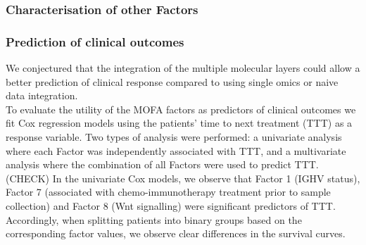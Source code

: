 \subsubsection{Characterisation of other Factors}

\subsubsection{Prediction of clinical outcomes}


We conjectured that the integration of the multiple molecular layers could allow a better prediction of clinical response compared to using single omics or naive data integration.\\
To evaluate the utility of the MOFA factors as predictors of clinical outcomes we fit Cox regression models \cite{Cox1972} using the patients' time to next treatment (TTT) as a response variable. Two types of analysis were performed: a univariate analysis where each Factor was independently associated with TTT, and a multivariate analysis where the combination of all Factors were used to predict TTT.\\

(CHECK) In the univariate Cox models, we observe  that Factor 1 (IGHV status), Factor 7 (associated with chemo-immunotherapy treatment prior to sample collection) and Factor 8 (Wnt signalling) were significant predictors of TTT. Accordingly, when splitting patients into binary groups based on the corresponding factor values, we observe clear differences in the survival curves.\\

